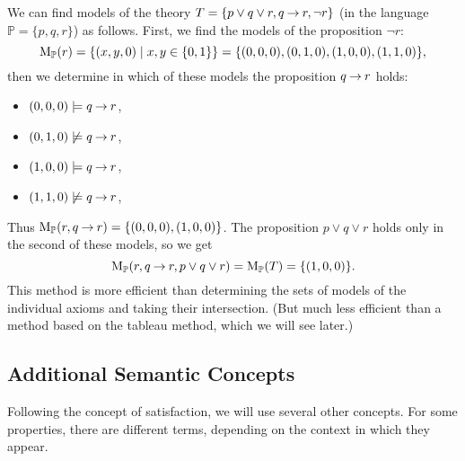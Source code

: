 \begin{example}
    We can find models of the theory $T = \{p \lor q \lor r, q \mathbin{\rightarrow} r, \neg r\}$ (in the language $\mathbb{P} = \{p, q, r\}$) as follows. First, we find the models of the proposition $\neg r$:
    $$
    \operatorname{M}_\mathbb{P}(r) = \{(x, y, 0) \mid x, y \in \{0,1\}\} = \{(0,0,0),(0,1,0),(1,0,0),(1,1,0)\},
    $$
    then we determine in which of these models the proposition $q \mathbin{\rightarrow} r$ holds: 
    \begin{itemize}
        \item $(0,0,0) \models q \mathbin{\rightarrow} r$,
        \item $(0,1,0) \not\models q \mathbin{\rightarrow} r$,
        \item $(1,0,0) \models q \mathbin{\rightarrow} r$,
        \item $(1,1,0) \not\models q \mathbin{\rightarrow} r$,
    \end{itemize}  
    Thus $\operatorname{M}_\mathbb{P}(r, q \mathbin{\rightarrow} r) = \{(0,0,0),(1,0,0)\}$. The proposition $p \lor q \lor r$ holds only in the second of these models, so we get
    $$
    \operatorname{M}_\mathbb{P}(r, q \mathbin{\rightarrow} r, p \lor q \lor r) = \operatorname{M}_\mathbb{P}(T) = \{(1,0,0)\}.
    $$
    This method is more efficient than determining the sets of models of the individual axioms and taking their intersection. (But much less efficient than a method based on the tableau method, which we will see later.)
\end{example}

\subsection{Additional Semantic Concepts}

Following the concept of satisfaction, we will use several other concepts. For some properties, there are different terms, depending on the context in which they appear.

